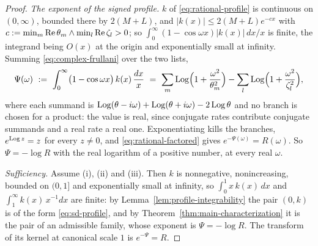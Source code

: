 \begin{proof}
\emph{The exponent of the signed profile.} $k$ of \ref{eq:rational-profile} is continuous on
$(0,\infty)$, bounded there by $2(M+L)$, and $|k(x)| \le 2(M+L)e^{-cx}$ with
$c := \min_m\operatorname{Re}\theta_m \wedge \min_l\operatorname{Re}\zeta_l > 0$; so
$\int_0^\infty(1-\cos\omega x)|k(x)|\,dx/x$ is finite, the integrand being $O(x)$ at the origin
and exponentially small at infinity. Summing \ref{eq:complex-frullani} over the two lists,
\[
  \Psi(\omega) \ :=\ \int_0^\infty \bigl(1 - \cos\omega x\bigr)\,k(x)\,\frac{dx}{x}
   \ =\ \sum_{m}\operatorname{Log}\Bigl(1 + \frac{\omega^2}{\theta_m^2}\Bigr)
        - \sum_{l}\operatorname{Log}\Bigl(1 + \frac{\omega^2}{\zeta_l^2}\Bigr) ,
\]
where each summand is $\operatorname{Log}(\theta-i\omega) + \operatorname{Log}(\theta+i\omega) - 2\operatorname{Log}\theta$ and no branch is
chosen for a product: the value is real, since conjugate rates contribute conjugate summands and a
real rate a real one. Exponentiating kills the branches, $e^{\operatorname{Log} z} = z$ for every $z \ne 0$, and
\ref{eq:rational-factored} gives $e^{-\Psi(\omega)} = R(\omega)$. So $\Psi = -\log R$ with the
real logarithm of a positive number, at every real $\omega$.

\emph{Sufficiency.} Assume (i), (ii) and (iii). Then $k$ is nonnegative, nonincreasing, bounded on
$(0,1]$ and exponentially small at infinity, so $\int_0^1 x\,k(x)\,dx$ and
$\int_1^\infty k(x)\,x^{-1}dx$ are finite: by Lemma~\ref{lem:profile-integrability} the pair
$(0,k)$ is of the form \ref{eq:sd-profile}, and by Theorem~\ref{thm:main-characterization} it is
the pair of an admissible family, whose exponent is $\Psi = -\log R$. The transform of its kernel
at canonical scale $1$ is $e^{-\Psi} = R$.


\end{proof}
